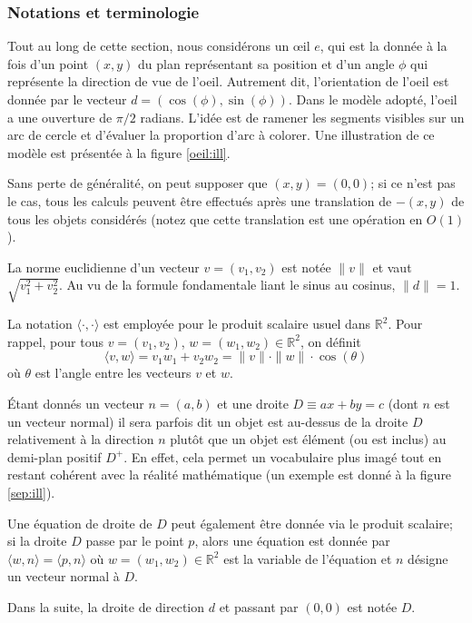 \subsubsection*{Notations et terminologie}
Tout au long de cette section, nous considérons un \oe{}il $e$, qui est la donnée à
la fois d'un point $(x, y)$ du plan représentant sa position et d'un angle $\phi$
qui représente la direction de vue de l'oeil. Autrement dit, l'orientation de
l'oeil est donnée par le vecteur $d=(\cos(\phi), \sin(\phi))$. Dans le modèle
adopté, l'oeil a une ouverture de $\pi/2$ radians. L'idée est de ramener
les segments visibles sur un arc de cercle et d'évaluer la proportion d'arc
à colorer. Une illustration de ce modèle est présentée à la figure \ref{oeil:ill}.



Sans perte de généralité, on peut supposer que $(x, y) = (0, 0)$;
si ce n'est pas le cas, tous les
calculs peuvent être effectués après une translation de $-(x, y)$ de tous
les objets considérés (notez que cette translation est une opération en $O(1)$).

La norme euclidienne d'un vecteur $v = (v_1, v_2)$ est notée
$\|v\|$ et vaut $\sqrt{v_1^2 + v_2^2}$. Au vu de la formule fondamentale liant le
sinus au cosinus, $\|d\| = 1$.

La notation $\langle \cdot,\cdot\rangle$ est employée pour le produit
scalaire usuel dans $\mathbb R^2$. Pour rappel,
pour tous $v=(v_1, v_2)$, $w=(w_1, w_2)\in\mathbb R^2$, on définit
$$\langle v, w\rangle = v_1 w_1 + v_2 w_2 = \|v\|\cdot\|w\|\cdot\cos(\theta)$$
où $\theta$ est l'angle entre les vecteurs $v$ et $w$.


\'Etant  donnés un vecteur $n = (a, b)$ et une droite $D\equiv ax+by=c$
(dont $n$ est un vecteur normal) il sera parfois dit
\og un objet est au-dessus de la droite $D$ relativement à la direction $n$\fg{}
plutôt que \og{}un objet est élément (ou est inclus) au demi-plan positif $D^+$\fg{}.
En effet, cela permet un vocabulaire plus imagé tout en restant cohérent
avec la réalité mathématique (un exemple est donné à la figure \ref{sep:ill}).

Une équation de droite de $D$ peut également être donnée via le produit scalaire;
si la droite $D$ passe par le point $p$, alors une équation est donnée par
$\langle w, n\rangle = \langle p, n\rangle$ où $w=(w_1, w_2)\in\mathbb R^2$ est
la variable de l'équation et $n$ désigne un vecteur normal à $D$.

Dans la suite, la droite de direction $d$ et passant par $(0, 0)$ est notée $D$.
